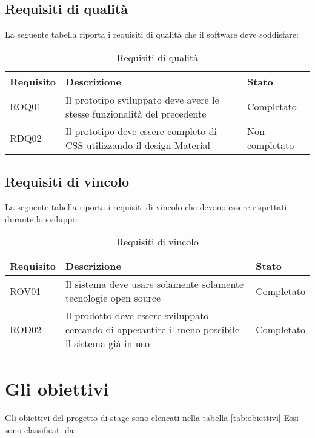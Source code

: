 \subsection*{Requisiti di qualità}
La seguente tabella riporta i requisiti di qualità che il software deve soddisfare:\\
\begin{table} [h]%
	\centering
	\caption{Requisiti di qualità}
	\label{tab:requisiti-di-qualità}
	\begin{tabular}[h]{|p{2.5cm}|p{8cm}|p{2.5cm}|}
		\hline
		\rule[-4mm]{0mm}{1cm}
		Requisito & Descrizione & Stato\\
		\hline
		\rule[-3mm]{0mm}{0.8cm}
		ROQ01&Il prototipo sviluppato deve avere le stesse funzionalità del precedente&Completato\\
		\hline
		\rule[-3mm]{0mm}{0.8cm}
		RDQ02&Il prototipo deve essere completo di CSS utilizzando il design Material&Non completato\\
		\hline	
	\end{tabular}
\end{table}

\subsection*{Requisiti di vincolo}
La seguente tabella riporta i requisiti di vincolo che devono essere rispettati durante lo sviluppo:
\begin{table}[h]
	\centering
	\caption{Requisiti di vincolo}
	\label{tab:requisiti-di-vincolo}
	\begin{tabular}[h]{|p{2.5cm}|p{8cm}|p{2.5cm}|}
		\hline
		\rule[-4mm]{0mm}{1cm}
		Requisito & Descrizione & Stato\\
		\hline
		\rule[-3mm]{0mm}{0.8cm}
		ROV01&Il sistema deve usare solamente solamente tecnologie open source&Completato\\
		\hline
		\rule[-3mm]{0mm}{0.8cm}
		ROD02&Il prodotto deve essere sviluppato cercando di appesantire il meno possibile il sistema già in uso &Completato\\
		\hline	
	\end{tabular}
\end{table}

\newpage

\section{Gli obiettivi}
Gli obiettivi del progetto di stage sono elencati nella tabella \ref{tab:obiettivi}
Essi sono classificati da:

